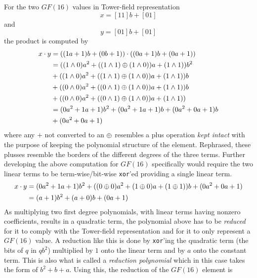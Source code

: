 For the two $GF(16)$ values in Tower-field representation
$$
    x = [11]b + [01]
$$
and
$$
    y = [01]b + [01]
$$
the product is computed by
\begin{equation*}
    \begin{split}
        x \cdot y &= ((1a + 1)b + (0b + 1)) \cdot ((0a + 1)b + (0a + 1))\\
        &= ((1 \wedge 0)a^2 + ((1 \wedge 1) \oplus (1 \wedge 0))a + (1 \wedge 1))b^2\\ 
        &+ ((1 \wedge 0)a^2 + ((1 \wedge 1) \oplus (1 \wedge 0))a + (1 \wedge 1))b\\
        &+ ((0 \wedge 0)a^2 + ((0 \wedge 1) \oplus (1 \wedge 0))a + (1 \wedge 1))b\\
        &+ ((0 \wedge 0)a^2 + ((0 \wedge 1) \oplus (1 \wedge 0))a + (1 \wedge 1))\\
        &= (0a^2 + 1a + 1)b^2 + (0a^2 + 1a + 1)b + (0a^2 + 0a + 1)b\\
        &+ (0a^2 + 0a + 1)\\
    \end{split}
\end{equation*}
where any $+$ not converted to an $\oplus$ resembles a plus operation \emph{kept intact} with the purpose of keeping the polynomial structure of the element. Rephrased, these plusses resemble the borders of the different degrees of the three terms. Further developing the above computation for $GF(16)$ specifically would require the two linear terms to be term-wise/bit-wise \texttt{xor}'ed providing a single linear term.
\begin{equation*}
    \begin{split}
        x\cdot y &= (0a^2 + 1a + 1)b^2 + ((0 \oplus 0)a^2 + (1 \oplus 0)a + (1 \oplus 1))b + (0a^2 + 0a + 1)\\
        &= (a + 1)b^2 + (a + 0)b + (0a + 1)
    \end{split}
\end{equation*}
As multiplying two first degree polynomials, with linear terms having nonzero coefficients, results in a quadratic term, the polynomial above has to be \emph{reduced} for it to comply with the Tower-field representation and for it to only represent a $GF(16)$ value. A reduction like this is done by \texttt{xor}'ing the quadratic term (the bits of $q$ in $qb^2$) multiplied by $1$ onto the linear term and by $a$ onto the constant term. This is also what is called a \emph{reduction polynomial} which in this case takes the form of $b^2 + b + a$. Using this, the reduction of the $GF(16)$ element is
